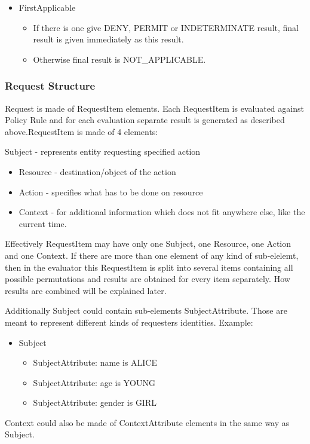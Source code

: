 \documentclass{article}
\newcommand\liststyleWWviiiNumxvii{%
\renewcommand\labelitemi{o}
\renewcommand\labelitemii{o}
\renewcommand\labelitemiii{[F0A7?]}
\renewcommand\labelitemiv{[F0B7?]}
}
\newcommand\liststyleWWviiiNumxix{%
\renewcommand\theenumi{\arabic{enumi}}
\renewcommand\theenumii{\arabic{enumii}}
\renewcommand\theenumiii{\arabic{enumiii}}
\renewcommand\labelitemi{o}
\renewcommand\labelenumi{\theenumi.}
\renewcommand\labelenumii{\theenumii.}
\renewcommand\labelenumiii{\theenumiii.}
}
\newcommand\liststyleWWviiiNumxviii{%
\renewcommand\labelitemi{o}
\renewcommand\labelitemii{o}
\renewcommand\labelitemiii{[F0A7?]}
\renewcommand\labelitemiv{[F0B7?]}
}
\begin{document}
\liststyleWWviiiNumxvii
\begin{itemize}
\item {\color{black}
FirstApplicable}

\begin{itemize}
\item {\color{black}
If there is one give DENY, PERMIT or INDETERMINATE result, final result
is given immediately as this result.}
\item {\color{black}
Otherwise final result is NOT\_APPLICABLE.}
\end{itemize}
\end{itemize}
\subsubsection{Request Structure}
{\upshape\color{black}
Request is made of RequestItem elements. Each RequestItem is evaluated
against Policy Rule and for each evaluation separate result is
generated as described above.RequestItem is made of 4 elements:}

{\color{black}
Subject - represents entity requesting specified action}

\liststyleWWviiiNumxix
\begin{itemize}
\item {\color{black}
Resource - destination/object of the action}
\item {\color{black}
Action - specifies what has to be done on resource}
\item {\color{black}
Context - for additional information which does not fit anywhere else,
like the current time.}
\end{itemize}
{\color{black}
Effectively RequestItem may have only one Subject, one Resource, one
Action and one Context. If there are more than one element of any kind
of sub-elelemt, then in the evaluator this RequestItem is split into
several items containing all possible permutations and results are
obtained for every item separately. How results are combined will be
explained later.}

{\color{black}
Additionally Subject could contain sub-elements SubjectAttribute. Those
are meant to represent different kinds of requesters{\textquotesingle}
identities. Example:}

\liststyleWWviiiNumxviii
\begin{itemize}
\item {\color{black}
Subject}

\begin{itemize}
\item {\color{black}
SubjectAttribute: name is ALICE}
\item {\color{black}
SubjectAttribute: age is YOUNG}
\item {\color{black}
SubjectAttribute: gender is GIRL}
\end{itemize}
\end{itemize}
{\color{black}
Context could also be made of ContextAttribute elements in the same way
as Subject.}
\end{document}
